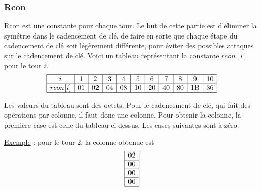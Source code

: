 \subsubsection{Rcon}
Rcon est une constante pour chaque tour. Le but de cette partie est d'éliminer la symétrie dans le cadencement de clé, de faire en sorte que chaque étape du cadencement de clé soit légèrement différente, pour éviter des possibles attaques sur le cadencement de clé. Voici un tableau représentant la constante $rcon[i]$ pour le tour $i$.
$$
\begin{array}{|c|c|c|c|c|c|c|c|c|c|c|} \hline
    i &1&2&3&4&5&6&7&8&9&10 \\ \hline
rcon[i]&01&02&04&08&10&20&40&80&1\text{B}&36 \\ \hline
\end{array}
$$

Les valeurs du tableau sont des octets. Pour le cadencement de clé, qui fait des opérations par colonne, il faut donc une colonne. Pour obtenir la colonne, la première case est celle du tableau ci-dessus. Les cases suivantes sont à zéro.

\noindent \underline{Exemple} : pour le tour 2, la colonne obtenue est 
$$\begin{array}{|c|} \hline
    02\\ \hline 00 \\ \hline 00 \\ \hline 00 \\ \hline
\end{array}$$